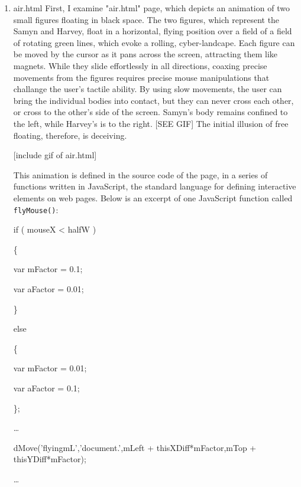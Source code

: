 \documentclass[11pt]{article}
\begin{document}
\begin{enumerate}
\item air.html
\label{sec:orgaad84df}
First, I examine "air.html" page, which depicts an animation of two
small figures floating in black space. The two figures, which
represent the Samyn and Harvey, float in a horizontal, flying position
over a field of a field of rotating green lines, which evoke a
rolling, cyber-landcape. Each figure can be moved by the cursor as it
pans across the screen, attracting them like magnets. While they slide
effortlessly in all directions, coaxing precise movements from the
figures requires precise mouse manipulations that challange the user's
tactile ability. By using slow movements, the user can bring the
individual bodies into contact, but they can never cross each other,
or cross to the other's side of the screen. Samyn's body remains
confined to the left, while Harvey's is to the right. [SEE GIF] The
initial illusion of free floating, therefore, is deceiving.

[include gif of air.html]

This animation is defined in the source code of the page, in a series
of functions written in JavaScript, the standard language for defining
interactive elements on web pages. Below is an excerpt of one
JavaScript function called \texttt{flyMouse()}:

\begin{SOURCE}
if ( mouseX < halfW )

\{

var mFactor = 0.1;

var aFactor = 0.01;

\}

else

\{

var mFactor = 0.01;

var aFactor = 0.1;

\};

\ldots{}

dMove('flyingmL','document.',mLeft + thisXDiff*mFactor,mTop + 
thisYDiff*mFactor);

\ldots{}


\end{SOURCE}
\end{enumerate}
\end{document}
